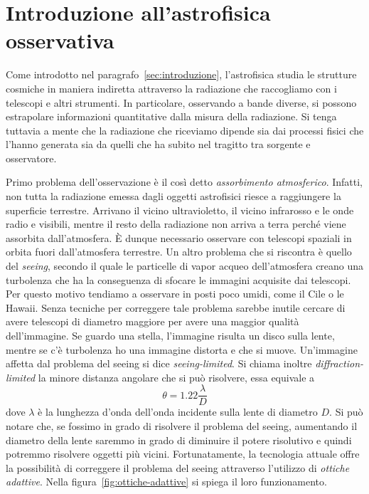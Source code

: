 \section{Introduzione all'astrofisica osservativa}\label{sec:astrofisica-osservativa}
Come introdotto nel paragrafo~\ref{sec:introduzione}, l'astrofisica studia le strutture cosmiche in maniera indiretta attraverso la radiazione che raccogliamo con i telescopi e altri strumenti. In particolare, osservando a bande diverse, si possono estrapolare informazioni quantitative dalla misura della radiazione. Si tenga tuttavia a mente che la radiazione che riceviamo dipende sia dai processi fisici che l'hanno generata sia da quelli che ha subito nel tragitto tra sorgente e osservatore.

Primo problema dell'osservazione è il così detto \emph{assorbimento atmosferico}. Infatti, non tutta la radiazione emessa dagli oggetti astrofisici riesce a raggiungere la superficie terrestre. Arrivano il vicino ultravioletto, il vicino infrarosso e le onde radio e visibili, mentre il resto della radiazione non arriva a terra perché viene assorbita dall'atmosfera. È dunque necessario osservare con telescopi spaziali in orbita fuori dall'atmosfera terrestre. Un altro problema che si riscontra è quello del \emph{seeing}, secondo il quale le particelle di vapor acqueo dell'atmosfera creano una turbolenza che ha la conseguenza di sfocare le immagini acquisite dai telescopi. Per questo motivo tendiamo a osservare in posti poco umidi, come il Cile o le Hawaii. Senza tecniche per correggere tale problema sarebbe inutile cercare di avere telescopi di diametro maggiore per avere una maggior qualità dell'immagine. Se guardo una stella, l'immagine risulta un disco sulla lente, mentre se c'è turbolenza ho una immagine distorta e che si muove. Un'immagine affetta dal problema del seeing si dice \emph{seeing-limited}. Si chiama inoltre \emph{diffraction-limited} la minore distanza angolare che si può risolvere, essa equivale a
\[
    \theta = 1.22 \frac{\lambda}{D}
\]
dove $\lambda$ è la lunghezza d'onda dell'onda incidente sulla lente di diametro $D$. Si può notare che, se fossimo in grado di risolvere il problema del seeing, aumentando il diametro della lente saremmo in grado di diminuire il potere risolutivo e quindi potremmo risolvere oggetti più vicini. Fortunatamente, la tecnologia attuale offre la possibilità di correggere il problema del seeing attraverso l'utilizzo di \emph{ottiche adattive}. Nella figura~\ref{fig:ottiche-adattive} si spiega il loro funzionamento. 

